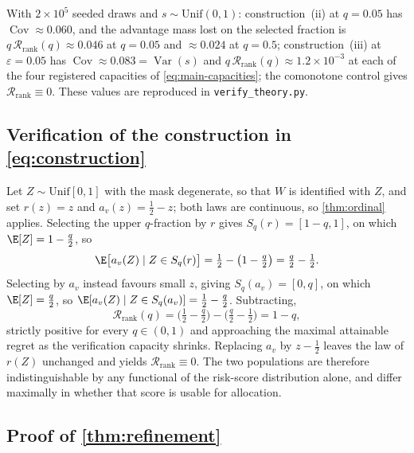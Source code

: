 With $2\times10^5$ seeded draws and $s\sim\mathrm{Unif}(0,1)$: construction~(ii)
at $q=0.05$ has $\operatorname{Cov}\approx0.060$, and the advantage mass lost on
the selected fraction is $q\,\mathcal R_{\mathrm{rank}}(q)\approx0.046$ at
$q=0.05$ and $\approx0.024$ at $q=0.5$; construction~(iii) at
$\varepsilon=0.05$ has
$\operatorname{Cov}\approx0.083=\operatorname{Var}(s)$ and
$q\,\mathcal R_{\mathrm{rank}}(q)\approx1.2\times10^{-3}$ at each of the four
registered capacities of \eqref{eq:main-capacities}; the comonotone control
gives $\mathcal R_{\mathrm{rank}}\equiv0$.  These values are reproduced in
\texttt{verify\_theory.py}.

\subsection{Verification of the construction in \texorpdfstring{\eqref{eq:construction}}{the construction equation}}

Let $Z\sim\mathrm{Unif}[0,1]$ with the mask degenerate, so that $W$ is identified
with $Z$, and set $r(z)=z$ and $a_v(z)=\tfrac12-z$; both laws are
continuous, so \cref{thm:ordinal} applies.  Selecting the upper $q$-fraction by
$r$ gives $S_q(r)=[1-q,1]$, on which $\E[Z]=1-\tfrac q2$, so
\begin{equation}
 \E\big[a_v(Z)\mid Z\in S_q(r)\big]=\tfrac12-\big(1-\tfrac q2\big)=\tfrac q2-\tfrac12 .
\end{equation}
Selecting by $a_v$ instead favours small $z$, giving $S_q(a_v)=[0,q]$, on which
$\E[Z]=\tfrac q2$, so
$\E[a_v(Z)\mid Z\in S_q(a_v)]=\tfrac12-\tfrac q2$.  Subtracting,
\begin{equation}
 \mathcal R_{\mathrm{rank}}(q)=\Big(\tfrac12-\tfrac q2\Big)-\Big(\tfrac q2-\tfrac12\Big)=1-q,
\end{equation}
strictly positive for every $q\in(0,1)$ and approaching the maximal attainable
regret as the verification capacity shrinks.  Replacing $a_v$ by $z-\tfrac12$
leaves the law of $r(Z)$ unchanged and yields
$\mathcal R_{\mathrm{rank}}\equiv0$.  The two populations are therefore
indistinguishable by any functional of the risk-score distribution alone, and
differ maximally in whether that score is usable for allocation.

\subsection{Proof of \texorpdfstring{\cref{thm:refinement}}{the refinement theorem}}

